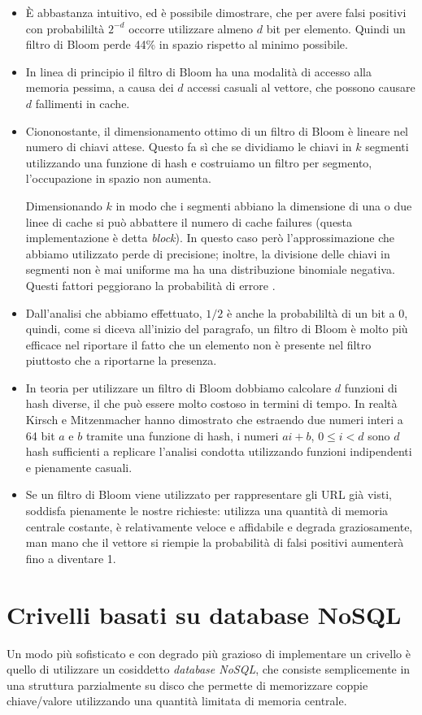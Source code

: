 \begin{itemize}
    \item È abbastanza intuitivo, ed è possibile dimostrare, che per avere falsi positivi con probabililtà $2^{-d}$ occorre utilizzare almeno $d$ bit per elemento. Quindi un filtro di Bloom perde 44\% in spazio rispetto al minimo possibile.
    \item In linea di principio il filtro di Bloom ha una modalità di accesso alla memoria pessima, a causa dei $d$ accessi casuali al vettore, che possono causare $d$ fallimenti in cache.
    \item Ciononostante, il dimensionamento ottimo di un filtro di Bloom è lineare nel numero di chiavi attese. Questo fa sì che se dividiamo le chiavi in $k$ segmenti utilizzando una funzione di hash e costruiamo un filtro per segmento, l'occupazione in spazio non aumenta.

    Dimensionando $k$ in modo che i segmenti abbiano la dimensione di una o due linee di cache si può abbattere il numero di cache failures (questa implementazione è detta \textit{block}). In questo caso però l'approssimazione che abbiamo utilizzato perde di precisione; inoltre, la divisione delle chiavi in segmenti non è mai uniforme ma ha una distribuzione binomiale negativa. Questi fattori peggiorano la probabilità di errore \cite{Putze}.
    \item Dall'analisi che abbiamo effettuato, $1/2$ è anche la probabililtà di un bit a 0, quindi, come si diceva all'inizio del paragrafo, un filtro di Bloom è molto più efficace nel riportare il fatto che un elemento non è presente nel filtro piuttosto che a riportarne la presenza.
    \item In teoria per utilizzare un filtro di Bloom dobbiamo calcolare $d$ funzioni di hash diverse, il che può essere molto costoso in termini di tempo. In realtà Kirsch e Mitzenmacher hanno dimostrato che estraendo due numeri interi a 64 bit $a$ e $b$ tramite una funzione di hash, i numeri $ai + b$, $0 \leq i < d$ sono $d$ hash sufficienti a replicare l'analisi condotta utilizzando funzioni indipendenti e pienamente casuali.
    \item Se un filtro di Bloom viene utilizzato per rappresentare gli URL già visti, soddisfa pienamente le nostre richieste: utilizza una quantità di memoria centrale costante, è relativamente veloce e affidabile e degrada graziosamente, man mano che il vettore si riempie la probabilità di falsi positivi aumenterà fino a diventare 1.
\end{itemize}
\section{Crivelli basati su database NoSQL}
Un modo più sofisticato e con degrado più grazioso di implementare un crivello è quello di utilizzare un cosiddetto \textit{database NoSQL}, che consiste semplicemente in una struttura parzialmente su disco che permette di memorizzare coppie chiave/valore utilizzando una quantità limitata di memoria centrale.

